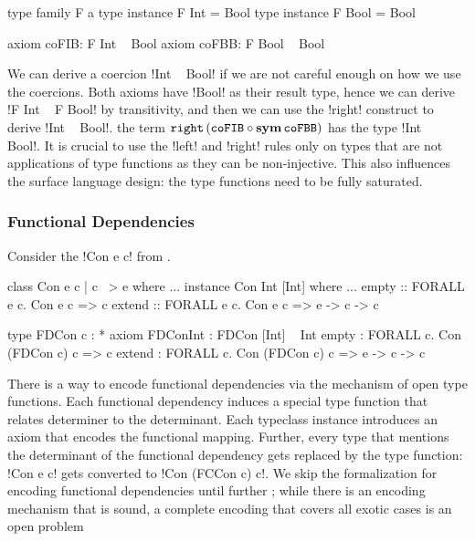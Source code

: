 \documentclass[screen,nonacm]{acmart}
\begin{document}
\begin{minipage}[ht]{0.5\linewidth}
\begin{code}
type family F a
type instance F Int = Bool
type instance F Bool = Bool
\end{code}
\end{minipage}%
\begin{minipage}[ht]{0.5\linewidth}
\begin{code}
axiom coFIB: F Int ~ Bool
axiom coFBB: F Bool ~ Bool
\end{code}
\end{minipage}

We can derive a coercion !Int ~ Bool! if we are not careful enough on how we use the coercions. Both axioms have !Bool! as their result type, hence we can derive !F Int ~ F Bool! by transitivity, and then we can use the !right! construct to derive !Int ~ Bool!. the term $\texttt{right}\,({\texttt{coFIB}} \circ {\textbf{sym}\,{\texttt{coFBB}}})$ has the type !Int ~ Bool!. It is crucial to use the !left! and !right! rules only on types that are not applications of type functions as they can be non-injective. This also influences the surface language design: the type functions need to be fully saturated.

\subsubsection{Functional Dependencies}\label{sec:fc-encodes-fundeps}
Consider the !Con e c! from .

\begin{minipage}[ht]{0.5\linewidth}
\begin{code}
class Con e c | c ~> e where ...
instance Con Int [Int] where ...
empty :: FORALL e c. Con e c => c
extend :: FORALL e c. Con e c => e -> c -> c
\end{code}
\end{minipage}%
\begin{minipage}[ht]{0.5\linewidth}
\begin{code}
type FDCon c : *
axiom FDConInt : FDCon [Int] ~ Int
empty  : FORALL c. Con (FDCon c) c => c
extend : FORALL c. Con (FDCon c) c => e -> c -> c
\end{code}
\end{minipage}

There is a way to encode functional dependencies via the mechanism of open type functions. Each functional dependency induces a special type function that relates determiner to the determinant. Each typeclass instance introduces an axiom that encodes the functional mapping. Further, every type that mentions the determinant of the functional dependency gets replaced by the type function: !Con e c! gets converted to !Con (FCCon c) c!.
We skip the formalization for encoding functional dependencies until further ; while there is an encoding mechanism that is sound, a complete encoding that covers all exotic cases is an open problem
\end{document}
